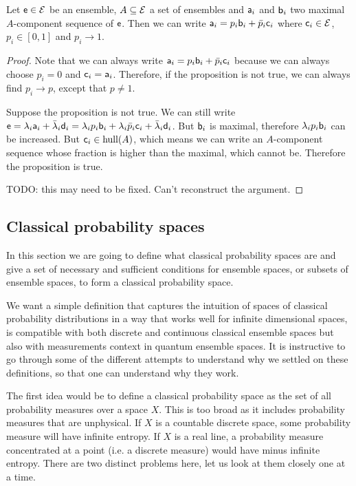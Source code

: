 \begin{prop}
	Let $\ens \in \Ens$ be an ensemble, $A \subseteq \Ens$ a set of ensembles and $\ens[a]_i$ and $\ens[b]_i$ two maximal $A$-component sequence of $\ens$. Then we can write $\ens[a]_i = p_i \ens[b]_i + \bar{p}_i \ens[c]_i$ where $\ens[c]_i \in \Ens$, $p_i \in [0,1]$ and $p_i \to 1$.
\end{prop}

\begin{proof}
	Note that we can always write $\ens[a]_i = p_i \ens[b]_i + \bar{p}_i \ens[c]_i$ because we can always choose $p_i = 0$ and $\ens[c]_i = \ens[a]_i$. Therefore, if the proposition is not true, we can always find $p_i \to p$, except that $p \neq 1$.
	
	Suppose the proposition is not true. We can still write $\ens = \lambda_i \ens[a]_i + \bar{\lambda}_i \ens[d]_i = \lambda_i p_i \ens[b]_i + \lambda_i \bar{p}_i \ens[c]_i + \bar{\lambda}_i \ens[d]_i$. But $\ens[b]_i$ is maximal, therefore $\lambda_i p_i \ens[b]_i$ can be increased. But $\ens[c]_i \in \hull(A)$, which means we can write an $A$-component sequence whose fraction is higher than the maximal, which cannot be. Therefore the proposition is true.
	
	TODO: this may need to be fixed. Can't reconstruct the argument.
\end{proof}

\subsection{Classical probability spaces}

In this section we are going to define what classical probability spaces are and give a set of necessary and sufficient conditions for ensemble spaces, or subsets of ensemble spaces, to form a classical probability space.

We want a simple definition that captures the intuition of spaces of classical probability distributions in a way that works well for infinite dimensional spaces, is compatible with both discrete and continuous classical ensemble spaces but also with measurements context in quantum ensemble spaces. It is instructive to go through some of the different attempts to understand why we settled on these definitions, so that one can understand why they work.

The first idea would be to define a classical probability space as the set of all probability measures over a space $X$. This is too broad as it includes probability measures that are unphysical. If $X$ is a countable discrete space, some probability measure will have infinite entropy. If $X$ is a real line, a probability measure concentrated at a point (i.e. a discrete measure) would have minus infinite entropy. There are two distinct problems here, let us look at them closely one at a time.

